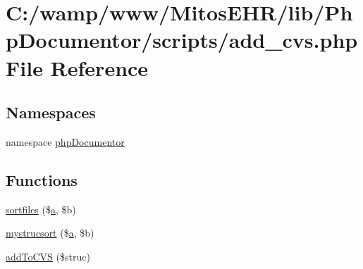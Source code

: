 \hypertarget{add__cvs_8php}{\section{\-C\-:/wamp/www/\-Mitos\-E\-H\-R/lib/\-Php\-Documentor/scripts/add\-\_\-cvs.php \-File \-Reference}
\label{add__cvs_8php}
}
\subsection*{\-Namespaces}
\begin{DoxyCompactItemize}
\item 
namespace \hyperlink{namespacephp_documentor}{php\-Documentor}
\end{DoxyCompactItemize}
\subsection*{\-Functions}
\begin{DoxyCompactItemize}
\item 
\hyperlink{add__cvs_8php_ae1133b6a8bceee942cb7cc092234e80f}{sortfiles} (\$\hyperlink{classa}{a}, \$b)
\item 
\hyperlink{add__cvs_8php_a8119f106ef7a92f6c4971ce181885730}{mystrucsort} (\$\hyperlink{classa}{a}, \$b)
\item 
\hyperlink{add__cvs_8php_a8d8fe48e099b8a8c699369dae37d5b2a}{add\-To\-C\-V\-S} (\$struc)
\end{DoxyCompactItemize}
